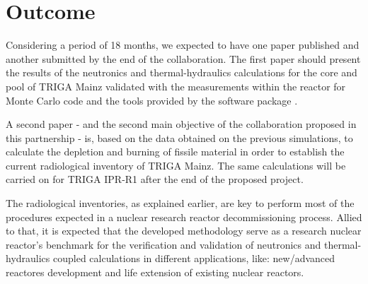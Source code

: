 \documentclass[11pt]{article} %
\begin{document}



\section{Outcome}

Considering a period of 18 months, we expected to have one paper published and another submitted by the end of the collaboration. The first paper should present the results of the neutronics and thermal-hydraulics calculations for the core and pool of TRIGA Mainz validated with the measurements within the reactor for \cite[OpenMC]{OpenMC_2015} Monte Carlo code and the tools provided by the software package \cite[SCALE]{SCALE_632}.


A second paper - and the second main objective of the collaboration proposed in this partnership - is, based on the data obtained on the previous simulations, to calculate the depletion and burning of fissile material in order to establish the current radiological inventory of TRIGA Mainz. The same calculations will be carried on for TRIGA IPR-R1 after the end of the proposed project.

The radiological inventories, as explained earlier, are key to perform most of the procedures expected in a nuclear research reactor decommissioning process. Allied to that, it is expected that the developed methodology serve as a research nuclear reactor's benchmark for the verification and validation of neutronics and thermal-hydraulics coupled calculations in different applications, like: new/advanced reactores development and life extension of existing nuclear reactors.
\end{document}
